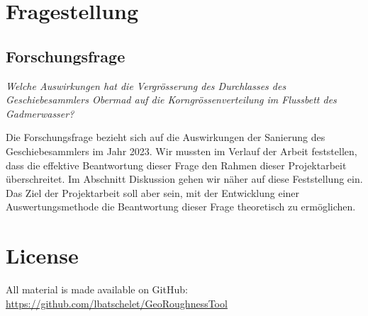 \documentclass[10pt]{extarticle}
\newcommand{\github}[1]{%
    \href{#1}{\faGithubSquare}%
}
\begin{document}
\section{Fragestellung}\label{sec:fragestellung}

    \subsection{Forschungsfrage}\label{subsec:forschungsfrage}

        \textit{Welche Auswirkungen hat die Vergrösserung des Durchlasses des Geschiebesammlers Obermad auf die Korngrössenverteilung im Flussbett des Gadmerwasser?}

        Die Forschungsfrage bezieht sich auf die Auswirkungen der Sanierung des Geschiebesammlers im Jahr 2023. Wir mussten im Verlauf der Arbeit feststellen, dass die effektive Beantwortung dieser Frage den Rahmen dieser Projektarbeit überschreitet. Im Abschnitt Diskussion gehen wir näher auf diese Feststellung ein. Das Ziel der Projektarbeit soll aber sein, mit der Entwicklung einer Auswertungsmethode die Beantwortung dieser Frage theoretisch zu ermöglichen.


\printbibliography


\section*{License}
    \doclicenseThis
    \github{https://github.com/lbatschelet/GeoRoughness-Tool} All material is made available on GitHub:
    \\ \href{https://github.com/lbatschelet/GeoRoughness-Tool}{https://github.com/lbatschelet/GeoRoughness\-Tool}
\end{document}
